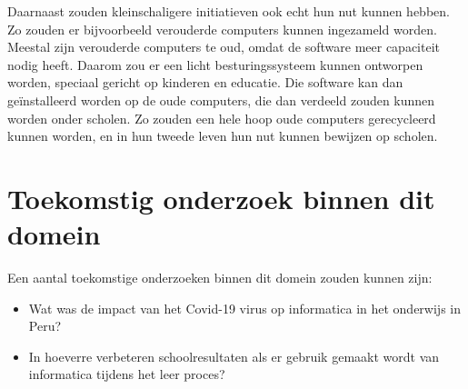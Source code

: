 Daarnaast zouden kleinschaligere initiatieven ook echt hun nut kunnen hebben. Zo zouden er bijvoorbeeld verouderde computers kunnen ingezameld worden. Meestal zijn verouderde computers te oud, omdat de software meer capaciteit nodig heeft. Daarom zou er een licht besturingssysteem kunnen ontworpen worden, speciaal gericht op kinderen en educatie. Die software kan dan geïnstalleerd worden op de oude computers, die dan verdeeld zouden kunnen  worden onder scholen. Zo zouden een hele hoop oude computers gerecycleerd kunnen worden, en in hun tweede leven hun nut kunnen bewijzen op scholen.

\section{Toekomstig onderzoek binnen dit domein}

Een aantal toekomstige onderzoeken binnen dit domein zouden kunnen zijn: 
\begin{itemize}
	\item Wat was de impact van het Covid-19 virus op informatica in het onderwijs in Peru?
	\item In hoeverre verbeteren schoolresultaten als er gebruik gemaakt wordt van informatica tijdens het leer proces?
\end{itemize}

